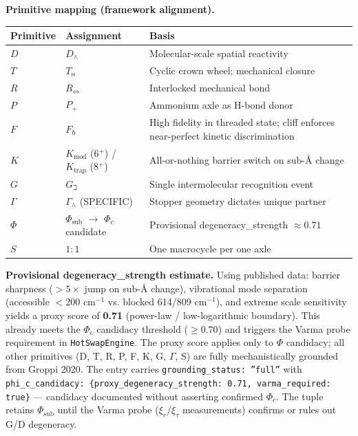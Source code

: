 \documentclass[12pt,a4paper]{article}
\begin{document}
\textbf{Primitive mapping (framework alignment).}

\begin{table}[htbp]
\centering
\small
{}
\begin{tabularx}{\textwidth}{>{\centering\arraybackslash}X >{\centering\arraybackslash}X >{\centering\arraybackslash}X}
\toprule
\rowcolor{gray!25}\textbf{Primitive} & \textbf{Assignment} & \textbf{Basis} \\
\midrule
\rowcolors{1}{white}{gray!10}
$D$ & $D_\wedge$ & Molecular-scale spatial reactivity \\
$T$ & $T_{\bowtie}$ & Cyclic crown wheel; mechanical closure \\
$R$ & $R_{\Leftrightarrow}$ & Interlocked mechanical bond \\
$P$ & $P_+$ & Ammonium axle as H-bond donor \\
$F$ & $F_\hbar$ & High fidelity in threaded state; cliff enforces near-perfect kinetic discrimination \\
$K$ & $K_\text{mod}$ (6$^+$) / $K_\text{trap}$ (8$^+$) & All-or-nothing barrier switch on sub-Å change \\
$G$ & $G_\beth$ & Single intermolecular recognition event \\
$\Gamma$ & $\Gamma_\wedge$ (SPECIFIC) & Stopper geometry dictates unique partner \\
$\Phi$ & $\Phi_\text{sub}$ $\to$ $\Phi_c$ candidate & Provisional degeneracy\_strength $\approx 0.71$ \\
$S$ & $1:1$ & One macrocycle per one axle \\
\bottomrule
\end{tabularx}
\end{table}

\textbf{Provisional degeneracy\_strength estimate.} Using published data: barrier sharpness ($> 5\times$ jump on sub-Å change), vibrational mode separation (accessible $< 200$ cm$^{-1}$ vs. blocked 614/809 cm$^{-1}$), and extreme scale sensitivity yields a proxy score of \textbf{0.71} (power-law / low-logarithmic boundary). This already meets the $\Phi_c$ candidacy threshold ($\geq 0.70$) and triggers the Varma probe requirement in \texttt{HotSwapEngine}. The proxy score applies only to $\Phi$ candidacy; all other primitives (D, T, R, P, F, K, G, $\Gamma$, S) are fully mechanistically grounded from Groppi 2020. The entry carries \texttt{grounding\_status: ''full''} with \texttt{phi\_c\_candidacy: \{proxy\_degeneracy\_strength: 0.71, varma\_required: true\}} --- candidacy documented without asserting confirmed $\Phi_c$. The tuple retains $\Phi_{\text{sub}}$ until the Varma probe ($\xi_r$/$\xi_\tau$ measurements) confirms or rules out G/D degeneracy.
\end{document}
